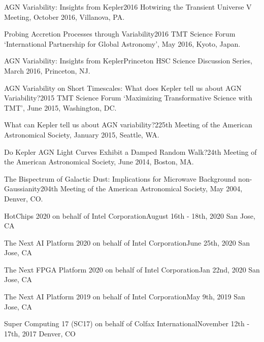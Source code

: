 \documentclass[10pt,a4paper]{article}
\begin{document}
\inlineheadsection
  {AGN Variability: Insights from Kepler}{2016 Hotwiring the Transient Universe V Meeting, October 2016, Villanova, PA.}

\inlineheadsection
  {Probing Accretion Processes through Variability}{2016 TMT Science Forum `International Partnership for Global Astronomy', May 2016, Kyoto, Japan.}

\inlineheadsection
  {AGN Variability: Insights from Kepler}{Princeton HSC Science Discussion Series, March 2016, Princeton, NJ.}

\inlineheadsection
  {AGN Variability on Short Timescales: What does Kepler tell us about AGN Variability?}{2015 TMT Science Forum `Maximizing Transformative Science with TMT', June 2015, Washington, DC.}

\inlineheadsection
  {What can Kepler tell us about AGN variability?}{225th Meeting of the American Astronomical Society, January 2015, Seattle, WA.}

\inlineheadsection
  {Do Kepler AGN Light Curves Exhibit a Damped Random Walk?}{24th Meeting of the American Astronomical Society, June 2014, Boston, MA.}

\inlineheadsection
  {The Bispectrum of Galactic Dust: Implications for Microwave Background non-Gaussianity}{204th Meeting of the American Astronomical Society, May 2004, Denver, CO.}

\spacedhrule{2.0em}{0.2em}


\inlineheadsection
  {HotChips 2020 on behalf of Intel Corporation}{August 16th - 18th, 2020 San Jose, CA}

\inlineheadsection
  {The Next AI Platform 2020 on behalf of Intel Corporation}{June 25th, 2020 San Jose, CA}

  \inlineheadsection
    {The Next FPGA Platform 2020 on behalf of Intel Corporation}{Jan 22nd, 2020 San Jose, CA}

\inlineheadsection
  {The Next AI Platform 2019 on behalf of Intel Corporation}{May 9th, 2019 San Jose, CA}

\inlineheadsection
  {Super Computing 17 (SC17) on behalf of Colfax International}{November 12th - 17th, 2017 Denver, CO}
\end{document}
